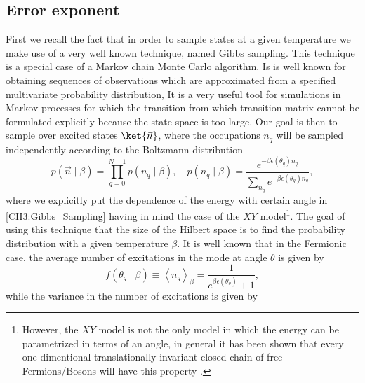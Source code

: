 \subsection{Error exponent}

First we recall the fact that in order to sample states at a given temperature we make use of a very well known technique, named Gibbs sampling. This technique is a special case of a Markov chain Monte Carlo algorithm. Is is well known for obtaining sequences of observations which are approximated from a specified multivariate probability distribution, It is a very useful tool for simulations in Markov processes for which the transition from which transition matrix cannot be formulated explicitly because the state space is too large\cite{robert_multi-stage_2004,gilks_markov_1996,noauthor_gibbs_nodate}. Our goal is then to sample over excited states $\ket{\vec{n}}$, where the occupations $n_q$ will be sampled independently according to the Boltzmann distribution
\begin{equation}
p(\vec{n} \mid \beta)=\prod_{q=0}^{N-1} p\left(n_{q} \mid \beta\right), \quad p\left(n_{q} \mid \beta\right)=\frac{e^{-\beta \epsilon\left(\theta_{q}\right) n_{q}}}{\sum_{n_{q}} e^{-\beta \epsilon\left(\theta_{q}\right) n_{q}}},
\label{CH3:Gibbs_Sampling}
\end{equation}
where we explicitly put the dependence of the energy with certain angle in \eqref{CH3:Gibbs_Sampling} having in mind the case of the $XY$ model\footnote{However, the $XY$ model is not the only model in which the energy can be parametrized in terms of an angle, in general it has been shown that every one-dimentional translationally invariant closed chain of free Fermions/Bosons will have this property \cite{eisert_area_2010,fradkin_field_1997,katsura_statistical_1962,latorre_ground_2004,lieb_two_1961}.}. The goal of using this technique  that the size of the Hilbert space is to find the probability distribution with a given temperature $\beta$. It is well known that in the Fermionic case, the average number of excitations in the mode at angle $\theta$ is given by
\begin{equation}
f\left(\theta_{q} \mid \beta\right) \equiv\left\langle n_{q}\right\rangle_{\beta}=\frac{1}{e^{\beta \epsilon\left(\theta_{q}\right)} + 1},
\end{equation}
while the variance in the number of excitations is given by

